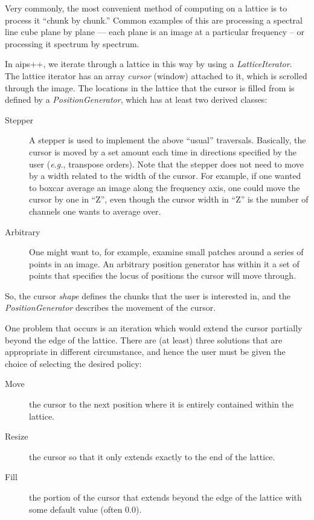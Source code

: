 Very commonly, the most convenient method of computing on a lattice is
to process it ``chunk by chunk.'' Common examples of this are
processing a spectral line cube plane by plane --- each plane is an
image at a particular frequency -- or processing it spectrum by
spectrum.

In {\sc aips++}, we iterate through a lattice in this way by using a
{\em LatticeIterator}. The lattice iterator has an array {\em cursor}
(window) attached to it, which is scrolled through the image. The
locations in the lattice that the cursor is filled from is defined by
a {\em PositionGenerator}, which has at least two derived classes:
\begin{description}
	\item[Stepper] A stepper is used to implement the above
        ``usual'' traversals. Basically, the cursor is moved by a set
        amount each time in directions specified by the user ({\em e.g.},
        transpose orders). Note
        that the stepper does not need to move by a width related to
        the width of the cursor. For example, if one wanted to boxcar
        average an image along the frequency axis, one could move the
        cursor by one in ``Z'', even though the cursor width in ``Z''
        is the number of channels one wants to average over.
	\item[Arbitrary] One might want to, for example, examine small
        patches around a series of points in an image. An arbitrary
        position generator has within it a set of points that
        specifies the locus of positions the cursor will move through.
\end{description}

So, the cursor {\em shape} defines the chunks that the user is
interested in, and the {\em PositionGenerator} describes the movement
of the cursor.

One problem that occurs is an iteration which would extend the cursor
partially beyond the edge of the lattice. There are (at least) three
solutions that are appropriate in different circumstance, and hence
the user must be given the choice of selecting the desired policy:
\begin{description}
	\item[Move] the cursor to the next position where it is
	entirely contained within the lattice.
	\item[Resize] the cursor so that it only extends exactly to
        the end of the lattice.
	\item[Fill] the portion of the cursor that extends beyond the
	edge of the lattice with some default value (often 0.0).
\end{description}

